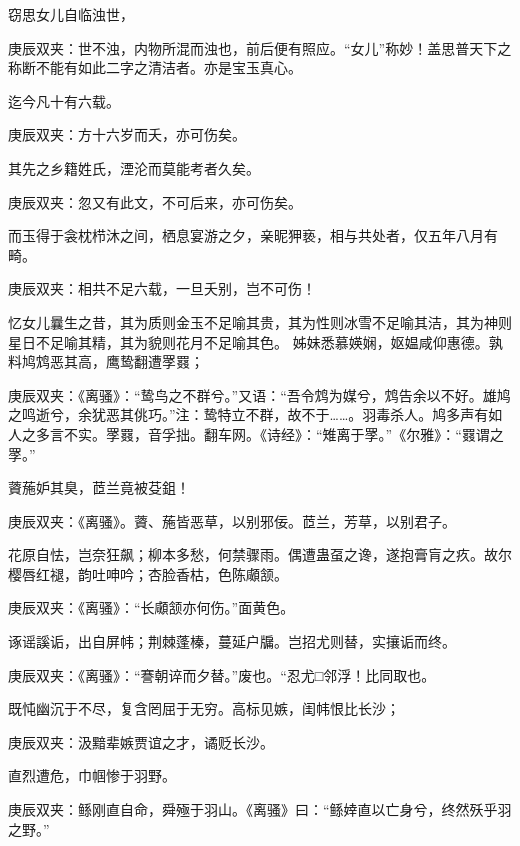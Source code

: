 \begin{qute2sp}
    \begin{parag}
        窃思女儿自临浊世，
        \begin{note}庚辰双夹：世不浊，内物所混而浊也，前后便有照应。“女儿”称妙！盖思普天下之称断不能有如此二字之清洁者。亦是宝玉真心。\end{note}
        迄今凡十有六载。
        \begin{note}庚辰双夹：方十六岁而夭，亦可伤矣。\end{note}
        其先之乡籍姓氏，湮沦而莫能考者久矣。
        \begin{note}庚辰双夹：忽又有此文，不可后来，亦可伤矣。\end{note}
        而玉得于衾枕栉沐之间，栖息宴游之夕，亲昵狎亵，相与共处者，仅五年八月有畸。
        \begin{note}庚辰双夹：相共不足六载，一旦夭别，岂不可伤！\end{note}
        忆女儿曩生之昔，其为质则金玉不足喻其贵，其为性则冰雪不足喻其洁，其为神则星日不足喻其精，其为貌则花月不足喻其色。
        姊妹悉慕媖娴，妪媪咸仰惠德。孰料鸠鸩恶其高，鹰鸷翻遭罦罬；
        \begin{note}庚辰双夹：《离骚》：“鸷鸟之不群兮。”又语：“吾令鸩为媒兮，鸩告余以不好。雄鸠之鸣逝兮，余犹恶其佻巧。”注：鸷特立不群，故不于……。羽毒杀人。鸠多声有如人之多言不实。罦罬，音孚拙。翻车网。《诗经》：“雉离于罦。”《尔雅》：“罬谓之罦。”\end{note}
        薋葹妒其臭，茝兰竟被芟鉏！
        \begin{note}庚辰双夹：《离骚》。薋、葹皆恶草，以别邪佞。茝兰，芳草，以别君子。\end{note}
        花原自怯，岂奈狂飙；柳本多愁，何禁骤雨。偶遭蛊虿之谗，遂抱膏肓之疚。故尔樱唇红褪，韵吐呻吟；杏脸香枯，色陈顑颔。
        \begin{note}庚辰双夹：《离骚》：“长顑颔亦何伤。”面黄色。\end{note}
        诼谣謑诟，出自屏帏；荆棘蓬榛，蔓延户牖。岂招尤则替，实攘诟而终。
        \begin{note}庚辰双夹：《离骚》：“謇朝谇而夕替。”废也。“忍尤□邻浮！比同取也。\end{note}
        既忳幽沉于不尽，复含罔屈于无穷。高标见嫉，闺帏恨比长沙；
        \begin{note}庚辰双夹：汲黯辈嫉贾谊之才，谲贬长沙。\end{note}
        直烈遭危，巾帼惨于羽野。
        \begin{note}庚辰双夹：鲧刚直自命，舜殛于羽山。《离骚》曰：“鲧婞直以亡身兮，终然殀乎羽之野。”\end{note}

\end{parag}
\end{qute2sp}
